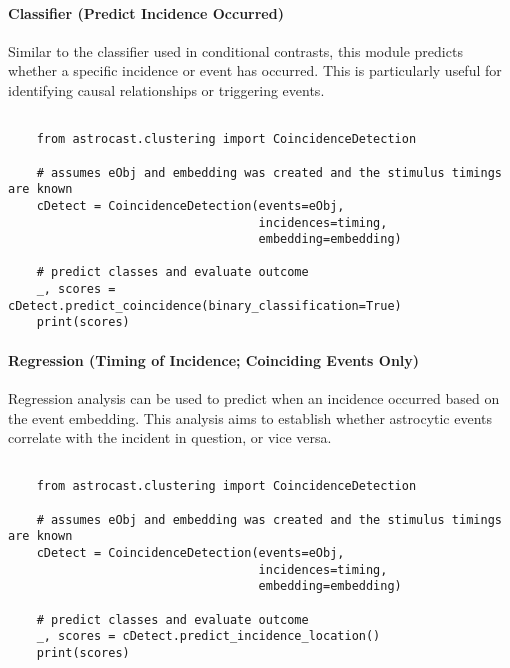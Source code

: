 \paragraph{Classifier (Predict Incidence Occurred)}
Similar to the classifier used in conditional contrasts, this module predicts whether a specific incidence or event has occurred. This is particularly useful for identifying causal relationships or triggering events.

\begin{lstlisting}[style=pyStyle]

    from astrocast.clustering import CoincidenceDetection

    # assumes eObj and embedding was created and the stimulus timings are known
    cDetect = CoincidenceDetection(events=eObj,
                                   incidences=timing,
                                   embedding=embedding)

    # predict classes and evaluate outcome
    _, scores = cDetect.predict_coincidence(binary_classification=True)
    print(scores)

\end{lstlisting}

\paragraph{Regression (Timing of Incidence; Coinciding Events Only)}
Regression analysis can be used to predict when an incidence occurred based on the event embedding. This analysis aims to establish whether astrocytic events correlate with the incident in question, or vice versa.

\begin{lstlisting}[style=pyStyle]

    from astrocast.clustering import CoincidenceDetection

    # assumes eObj and embedding was created and the stimulus timings are known
    cDetect = CoincidenceDetection(events=eObj,
                                   incidences=timing,
                                   embedding=embedding)

    # predict classes and evaluate outcome
    _, scores = cDetect.predict_incidence_location()
    print(scores)

\end{lstlisting}
